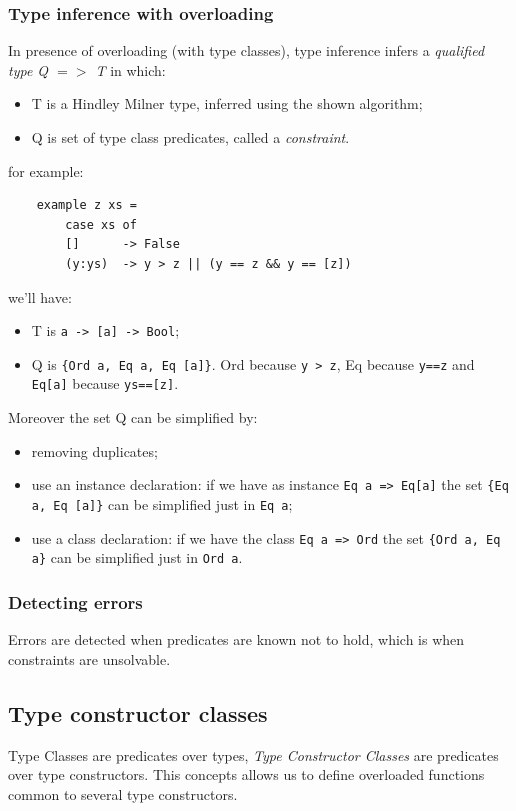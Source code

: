 \subsubsection{Type inference with overloading}
In presence of overloading (with type classes), type inference infers a \emph{qualified type Q $=>$ T} in which:
\begin{itemize}
    \item T is a Hindley Milner type, inferred using the shown algorithm;
    \item Q is set of type class predicates, called a \emph{constraint}.
\end{itemize}
for example:
\begin{verbatim}
    example z xs = 
        case xs of
        []      -> False
        (y:ys)  -> y > z || (y == z && y == [z]) 
\end{verbatim}
we'll have:
\begin{itemize}
    \item T is \verb|a -> [a] -> Bool|;
    \item Q is \verb|{Ord a, Eq a, Eq [a]}|.
    Ord because \verb|y > z|, Eq because \verb|y==z| and \verb|Eq[a]| because \verb|ys==[z]|.
\end{itemize}

Moreover the set Q can be simplified by:
\begin{itemize}
    \item removing duplicates;
    \item use an instance declaration: if we have as instance \verb|Eq a => Eq[a]| the set \verb|{Eq a, Eq [a]}| can be simplified just in \verb|Eq a|;
    \item use a class declaration: if we have the class \verb|Eq a => Ord| the set \verb|{Ord a, Eq a}| can be simplified just in \verb|Ord a|.
\end{itemize}

\subsubsection{Detecting errors}
Errors are detected when predicates are known not to hold, which is when constraints are unsolvable.

\subsection{Type constructor classes}
Type Classes are predicates over types, \emph{Type Constructor Classes} are predicates over type constructors.
This concepts allows us to define overloaded functions common to several type constructors.

